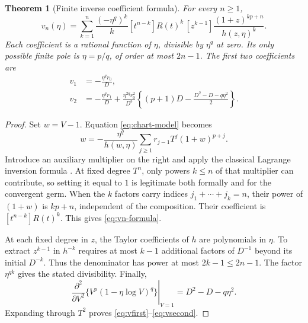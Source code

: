 \documentclass[11pt,a4paper]{article}
\numberwithin{equation}{section}
\newtheorem{theorem}{Theorem}[section]
\theoremstyle{definition}
\theoremstyle{remark}
\begin{document}
\begin{theorem}[Finite inverse coefficient formula]\label{thm:coefficients}
For every $n\ge1$,
\begin{equation}\label{eq:vn-formula}
 \boxed{\quad
 v_n(\eta)=\sum_{k=1}^n\frac{(-\eta^q)^k}{k}
  [t^{n-k}]R(t)^k\,
  [z^{k-1}]\frac{(1+z)^{kp+n}}{h(z,\eta)^k}.
 \quad}
\end{equation}
Each coefficient is a rational function of $\eta$, divisible by
$\eta^q$ at zero. Its only possible finite pole is $\eta=p/q$, of
order at most $2n-1$. The first two coefficients are
\begin{align}
 v_1&=-\frac{\eta^qr_0}{D},\label{eq:vfirst}\\
 v_2&=-\frac{\eta^qr_1}{D}
 +\frac{\eta^{2q}r_0^2}{D^3}
 \left\{(p+1)D-\frac{D^2-D-q\eta^2}{2}\right\}.
 \label{eq:vsecond}
\end{align}
\end{theorem}
\begin{proof}
Set $w=V-1$. Equation \eqref{eq:chart-model} becomes
\[
 w=-\frac{\eta^q}{h(w,\eta)}
   \sum_{j\ge1}r_{j-1}T^j(1+w)^{p+j}.
\]
Introduce an auxiliary multiplier on the right and apply the classical
Lagrange inversion formula \cite{gessel}. At fixed degree $T^n$,
only powers $k\le n$ of that multiplier can contribute, so setting
it equal to $1$ is legitimate both formally and for the convergent
germ. When the $k$ factors carry indices $j_1+\cdots+j_k=n$,
their power of $(1+w)$ is $kp+n$, independent of the composition.
Their coefficient is $[t^{n-k}]R(t)^k$. This gives
\eqref{eq:vn-formula}.

At each fixed degree in $z$, the Taylor coefficients of $h$ are
polynomials in $\eta$. To extract $z^{k-1}$ in $h^{-k}$ requires
at most $k-1$ additional factors of $D^{-1}$ beyond its initial
$D^{-k}$. Thus the denominator has power at most $2k-1\le2n-1$.
The factor $\eta^{qk}$ gives the stated divisibility. Finally,
\[
 \left.\frac{\partial^2}{\partial V^2}
   \{V^p(1-\eta\log V)^q\}\right|_{V=1}
   =D^2-D-q\eta^2.
\]
Expanding through $T^2$ proves \eqref{eq:vfirst}--\eqref{eq:vsecond}.
\end{proof}
\end{document}
